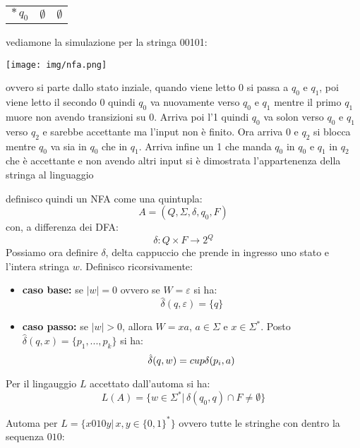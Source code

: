 \begin{esempio}
\begin{center}
\begin{tabular}{c|c|c}
\hline
$*\, q_0$ & $\emptyset$ & $\emptyset$
\end{tabular}
\end{center}
vediamone la simulazione per la stringa 00101:
\begin{center}
\texttt{[image: img/nfa.png]}
\end{center}
ovvero si parte dallo stato inziale, quando viene letto 0 si passa a $q_0$ e $q_1$, poi viene letto il secondo 0 quindi $q_0$ va nuovamente verso $q_0$ e $q_1$ mentre il primo $q_1$ muore non avendo transizioni su 0. Arriva poi l'1 quindi $q_0$ va solon verso $q_0$ e $q_1$ verso $q_2$ e sarebbe accettante ma l'input non è finito. Ora arriva 0 e $q_2$ si blocca mentre $q_0$ va sia in $q_0$ che in $q_1$. Arriva infine un 1 che manda $q_0$ in $q_0$ e $q_1$ in $q_2$ che è accettante e non avendo altri input si è dimostrata l'appartenenza della stringa al linguaggio
\end{esempio}
definisco quindi un NFA come una quintupla:
$$A=(Q,\Sigma,\delta,q_0,F)$$
con, a differenza dei DFA:
$$\delta:Q\times F\to 2^Q$$
Possiamo ora definire \^{$\delta$}, delta cappuccio che prende in ingresso uno stato e l'intera stringa $w$. Definisco ricorsivamente:
\begin{itemize}
\item \textbf{caso base:} se $|w|=0$ ovvero se $W=\varepsilon$ si ha:
$$\hat{\delta}(q,\varepsilon)=\{q\}$$
\item \textbf{caso passo:} se $|w|>0$, allora $W=xa$, $a\in\Sigma$ e $x\in\Sigma^*$. Posto $\hat{\delta}(q,x)=\{p_1,...,p_k\}$ si ha:
$$\hat{\delta}(q,w)=\\cup \delta(p_i,a)$$
\end{itemize}
Per il lingauggio $L$ accettato dall'automa si ha:
$$L(A)=\{w\in \Sigma^*|\, \hat{\delta}(q_0,q)\cap F\neq \emptyset\}$$
\begin{esempio}
Automa per $L=\{x010y|\,x,y\in\{0,1\}^*\}$ ovvero tutte le stringhe con dentro la sequenza $010$:
\begin{center}
\end{center}
\end{esempio}

